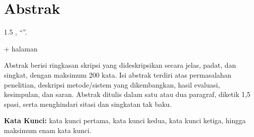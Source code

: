 \chapter*{Abstrak}
\begin{spacing}{1.5}
\noindent\textbf{\skNama}, ``\skJudul''.\par
\noindent\pageref{akhirfront}+\pageref{LastPage} halaman\par
\vspace{0.5\baselineskip}

\noindent\justifying
Abstrak berisi ringkasan skripsi yang dideskripsikan secara jelas, padat, dan
singkat, dengan maksimum 200 kata. Isi abstrak terdiri atas permasalahan
penelitian, deskripsi metode/sistem yang dikembangkan, hasil evaluasi, kesimpulan,
dan saran. Abstrak ditulis dalam satu atau dua paragraf, diketik 1,5 spasi, serta
menghindari sitasi dan singkatan tak baku.
\vspace{0.5\baselineskip}

\noindent\textbf{Kata Kunci:} \hangindent=2.2cm kata kunci pertama, kata kunci kedua,
kata kunci ketiga, hingga maksimum enam kata kunci.
\end{spacing}
